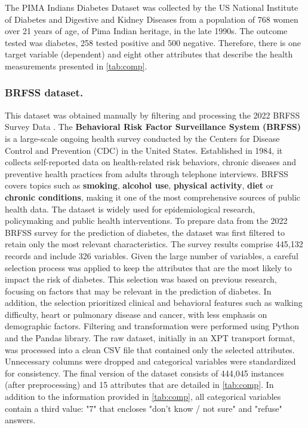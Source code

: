 \documentclass[runningheads]{llncs}
\begin{document}
The PIMA Indians Diabetes Dataset \cite{pimaDataset} was collected by the US National Institute of Diabetes and Digestive and Kidney Diseases from a population of 768 women over 21 years of age, of Pima Indian heritage, in the late 1990s. The outcome tested was diabetes, 258 tested positive and 500 negative. Therefore, there is one target variable (dependent) and eight other attributes that describe the health measurements presented in \autoref{tab:comp}. 


\subsubsection{BRFSS dataset.}

This dataset was obtained manually by filtering and processing the 2022 BRFSS Survey Data \cite{BRFSS2022}. The \textbf{Behavioral Risk Factor Surveillance System (BRFSS)} is a large-scale ongoing health survey conducted by the Centers for Disease Control and Prevention (CDC) in the United States. Established in 1984, it collects self-reported data on health-related risk behaviors, chronic diseases and preventive health practices from adults through telephone interviews. BRFSS covers topics such as \textbf{smoking}, \textbf{alcohol use}, \textbf{physical activity}, \textbf{diet} or \textbf{chronic conditions}, making it one of the most comprehensive sources of public health data. The dataset is widely used for epidemiological research, policymaking and public health interventions. 
To prepare data from the 2022 BRFSS survey for the prediction of diabetes, the dataset was first filtered to retain only the most relevant characteristics. The survey results comprise 445,132 records and include 326 variables. Given the large number of variables, a careful selection process was applied to keep the attributes that are the most likely to impact the risk of diabetes. This selection was based on previous research, focusing on factors that may be relevant in the prediction of diabetes. In addition, the selection prioritized clinical and behavioral features such as walking difficulty, heart or pulmonary disease and cancer, with less emphasis on demographic factors. 
Filtering and transformation were performed using Python and the Pandas library. The raw dataset, initially in an XPT transport format, was processed into a clean CSV file that contained only the selected attributes. Unnecessary columns were dropped and categorical variables were standardized for consistency. The final version of the dataset consists of 444,045 instances (after preprocessing) and 15 attributes that are detailed in \autoref{tab:comp}. 
In addition to the information provided in \autoref{tab:comp}, all categorical variables contain a third value: "7" that encloses "don't know / not sure" and "refuse" answers. 
\end{document}
